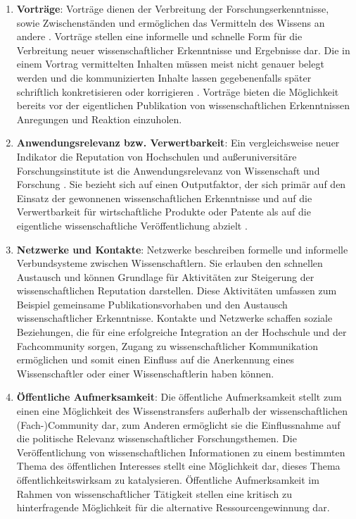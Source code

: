 \begin{enumerate}
\begin{end}
\begin{enumerate}
\item \textbf{Vorträge}: Vorträge dienen der Verbreitung der Forschungserkenntnisse, sowie Zwischenständen und ermöglichen das Vermitteln des Wissens an andere \cite{rassenhoevel_2010_performancemessung}. Vorträge stellen eine informelle und schnelle Form für die Verbreitung neuer wissenschaftlicher Erkenntnisse und Ergebnisse dar. Die in einem Vortrag vermittelten Inhalten müssen meist nicht genauer belegt werden und die kommunizierten Inhalte lassen gegebenenfalls später schriftlich konkretisieren oder korrigieren \cite{haberle_2002_jahrbuch}. Vorträge bieten die Möglichkeit bereits vor der eigentlichen Publikation von wissenschaftlichen Erkenntnissen Anregungen und Reaktion einzuholen.
\item\textbf{Anwendungsrelevanz bzw. Verwertbarkeit}: Ein vergleichsweise neuer Indikator die Reputation von Hochschulen und außeruniversitäre Forschungsinstitute ist die Anwendungsrelevanz von Wissenschaft und Forschung \cite{simon_2009_wissenschaft_governance}. Sie bezieht sich auf einen Outputfaktor, der sich primär auf den Einsatz der gewonnenen wissenschaftlichen Erkenntnisse und auf die Verwertbarkeit für wirtschaftliche Produkte oder Patente als auf die eigentliche wissenschaftliche Veröffentlichung abzielt \cite{suchen}.
\item \textbf{Netzwerke und Kontakte}: Netzwerke beschreiben formelle und informelle Verbundsysteme zwischen Wissenschaftlern. Sie erlauben den schnellen Austausch und können Grundlage für Aktivitäten zur Steigerung der wissenschaftlichen Reputation darstellen. Diese Aktivitäten umfassen zum Beispiel gemeinsame Publikationsvorhaben und den Austausch wissenschaftlicher Erkenntnisse. Kontakte und Netzwerke schaffen soziale Beziehungen, die für eine erfolgreiche Integration an der Hochschule und der Fachcommunity sorgen, Zugang zu wissenschaftlicher Kommunikation ermöglichen und somit einen Einfluss auf die Anerkennung eines Wissenschaftler oder einer Wissenschaftlerin haben können.
\item \textbf{Öffentliche Aufmerksamkeit}: Die öffentliche Aufmerksamkeit stellt zum einen eine Möglichkeit des Wissenstransfers außerhalb der wissenschaftlichen (Fach-)Community dar, zum Anderen ermöglicht sie die Einflussnahme auf die politische Relevanz wissenschaftlicher Forschungsthemen. Die Veröffentlichung von wissenschaftlichen Informationen zu einem bestimmten Thema des öffentlichen Interesses stellt eine Möglichkeit dar, dieses Thema öffentlichkeitswirksam zu katalysieren. Öffentliche Aufmerksamkeit im Rahmen von wissenschaftlicher Tätigkeit stellen eine kritisch zu hinterfragende Möglichkeit für die alternative Ressourcengewinnung dar. \cite{suche}

\end{enumerate}
\end{end}
\end{enumerate}
